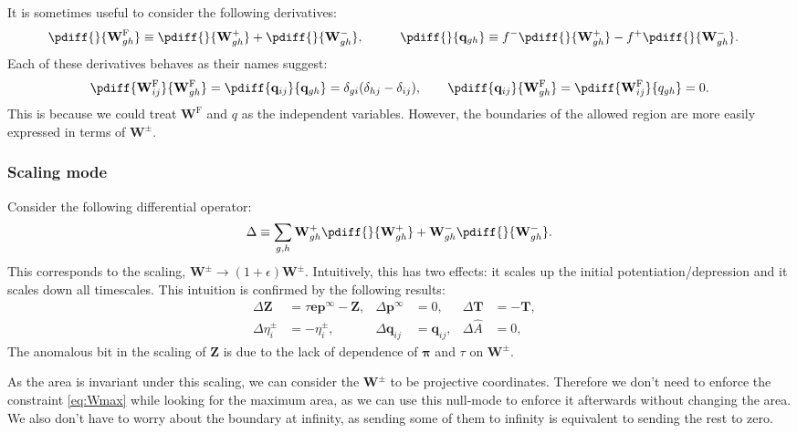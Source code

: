 \documentclass[12pt]{article}
\newcommand{\onev}{\mathbf{e}}
\newcommand{\eq}{\mathbf{p}^\infty}
\newcommand{\fpt}{\mathbf{T}}
\newcommand{\fund}{\mathbf{Z}}
\newcommand{\pib}{\boldsymbol{\pi}}
\newcommand{\W}{\mathbf{W}}
\newcommand{\enc}{\mathbf{q}}
\newcommand{\frg}{\W^{\mathrm{F}}}
\begin{document}
It is sometimes useful to consider the following derivatives:
%
\begin{equation}\label{eq:derivqw}
  \begin{aligned}
    \pdiff{}{\frg_{gh}} &\equiv     \pdiff{}{\W^+_{gh}} +     \pdiff{}{\W^-_{gh}} ,&\qquad
    \pdiff{}{\enc_{gh}}    &\equiv f^- \pdiff{}{\W^+_{gh}} - f^+ \pdiff{}{\W^-_{gh}} .
  \end{aligned}
\end{equation}
%
Each of these derivatives behaves as their names suggest:
%
\begin{equation}\label{eq:derivqweff}
  \pdiff{\frg_{ij}}{\frg_{gh}} = \pdiff{\enc_{ij}}{\enc_{gh}}
  =  \delta_{gi}(\delta_{hj}-\delta_{ij}),
  \qquad
  \pdiff{\enc_{ij}}{\frg_{gh}} = \pdiff{\frg_{ij}}{q_{gh}}  = 0.
\end{equation}
%
This is because we could treat $\frg$ and $q$ as the independent variables. However, the boundaries of the allowed region are more easily expressed in terms of $\W^\pm$.


\subsubsection{Scaling mode}\label{sec:rescale}

Consider the following differential operator:
%
\begin{equation}\label{eq:scaleop}
  \Delta \equiv \sum_{g,h} \W^+_{gh}\pdiff{}{\W^+_{gh}} + \W^-_{gh}\pdiff{}{\W^-_{gh}}.
\end{equation}
%
This corresponds to the scaling, $\W^\pm \to (1+\epsilon)\W^\pm$.
Intuitively, this has two effects: it scales up the initial potentiation/depression and it scales down all timescales.
This intuition is confirmed by the following results:
%
\begin{equation}\label{eq:scaleeffects}
  \begin{aligned}
    \Delta \fund &= \tau\onev\eq - \fund ,&
    \Delta \eq  &= 0 ,&
    \Delta \fpt  &= -\fpt ,
    \\
    \Delta \eta^\pm_i  &= - \eta^\pm_i ,&
    \Delta \enc_{ij} &= \enc_{ij} ,&
    \Delta \hat{A}  &= 0 ,&
  \end{aligned}
\end{equation}
%
The anomalous bit in the scaling of $\fund$ is due to the lack of dependence of $\pib$ and $\tau$ on $\W^\pm$.

As the area is invariant under this scaling, we can consider the $\W^\pm$ to be projective coordinates.
Therefore we don't need to enforce the constraint \eqref{eq:Wmax} while looking for the maximum area, as we can use this null-mode to enforce it afterwards without changing the area.
We also don't have to worry about the boundary at infinity,
as sending some of them to infinity is equivalent to sending the rest to zero.
\end{document}

